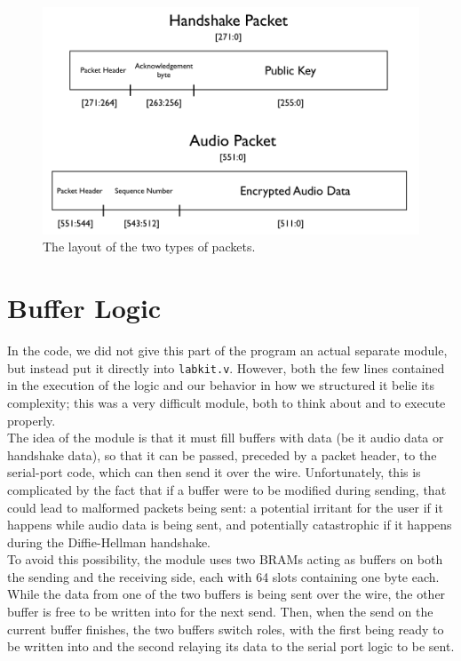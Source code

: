 \documentclass[a4paper]{report}
\begin{document}
\begin{figure}
\label{fig1}
\centering \caption{The layout of the two types of packets.} \includegraphics[width=\textwidth]{figs/packets.png}
\end{figure}

\section{Buffer Logic}

In the code, we did not give this part of the program an actual separate module, but instead put it directly into \verb|labkit.v|. However, both the few lines contained in the execution of the logic and our behavior in how we structured it belie its complexity; this was a very difficult module, both to think about and to execute properly. \\

The idea of the module is that it must fill buffers with data (be it audio data or handshake data), so that it can be passed, preceded by a packet header, to the serial-port code, which can then send it over the wire. Unfortunately, this is complicated by the fact that if a buffer were to be modified during sending, that could lead to malformed packets being sent: a potential irritant for the user if it happens while audio data is being sent, and potentially catastrophic if it happens during the Diffie-Hellman handshake. \\

To avoid this possibility, the module uses two BRAMs acting as buffers on both the sending and the receiving side, each with 64 slots containing one byte each. While the data from one of the two buffers is being sent over the wire, the other buffer is free to be written into for the next send. Then, when the send on the current buffer finishes, the two buffers switch roles, with the first being ready to be written into and the second relaying its data to the serial port logic to be sent.
\end{document}

